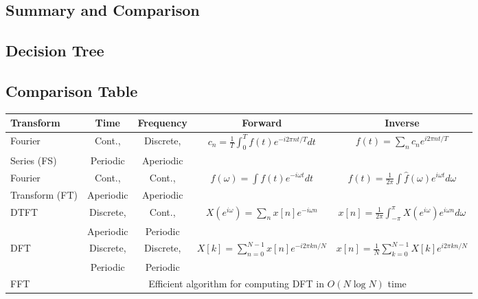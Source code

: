 \begin{notechapter}
\section{Summary and Comparison}

\subsection{Decision Tree}

\begin{center}
\end{center}

\subsection{Comparison Table}

\begin{center}
\small
\begin{tabular}{|l|c|c|c|c|}
\hline
\textbf{Transform} & \textbf{Time} & \textbf{Frequency} & \textbf{Forward} & \textbf{Inverse} \\
\hline
Fourier & Cont., & Discrete, & $c_n = \frac{1}{T}\int_0^T f(t) e^{-i2\pi nt/T} dt$ & $f(t) = \sum_n c_n e^{i2\pi nt/T}$ \\
Series (FS) & Periodic & Aperiodic & & \\
\hline
Fourier & Cont., & Cont., & $\hat{f}(\omega) = \int f(t) e^{-i\omega t} dt$ & $f(t) = \frac{1}{2\pi}\int \hat{f}(\omega) e^{i\omega t} d\omega$ \\
Transform (FT) & Aperiodic & Aperiodic & & \\
\hline
DTFT & Discrete, & Cont., & $X(e^{i\omega}) = \sum_n x[n] e^{-i\omega n}$ & $x[n] = \frac{1}{2\pi}\int_{-\pi}^{\pi} X(e^{i\omega}) e^{i\omega n} d\omega$ \\
& Aperiodic & Periodic & & \\
\hline
DFT & Discrete, & Discrete, & $X[k] = \sum_{n=0}^{N-1} x[n] e^{-i2\pi kn/N}$ & $x[n] = \frac{1}{N}\sum_{k=0}^{N-1} X[k] e^{i2\pi kn/N}$ \\
& Periodic & Periodic & & \\
\hline
FFT & \multicolumn{4}{c|}{Efficient algorithm for computing DFT in $O(N \log N)$ time} \\
\hline
\end{tabular}
\end{center}


\end{notechapter}
